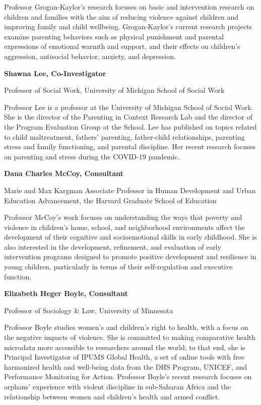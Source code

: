 \documentclass[
  letterpaper,
  DIV=11,
  numbers=noendperiod]{scrreprt}
\begin{document}
Professor Grogan-Kaylor's research focuses on basic and intervention
research on children and families with the aim of reducing violence
against children and improving family and child wellbeing.
Grogan-Kaylor's current research projects examine parenting behaviors
such as physical punishment and parental expressions of emotional warmth
and support, and their effects on children's aggression, antisocial
behavior, anxiety, and depression.

\textbf{Shawna Lee, Co-Investigator}

Professor of Social Work, University of Michigan School of Social Work

Professor Lee is a professor at the University of Michigan School of
Social Work. She is the director of the Parenting in Context Research
Lab and the director of the Program Evaluation Group at the School. Lee
has published on topics related to child maltreatment, fathers'
parenting, father-child relationships, parenting stress and family
functioning, and parental discipline. Her recent research focuses on
parenting and stress during the COVID-19 pandemic.

\textbf{Dana Charles McCoy, Consultant}

Marie and Max Kargman Associate Professor in Human Development and Urban
Education Advancement, the Harvard Graduate School of Education

Professor McCoy's work focuses on understanding the ways that poverty
and violence in children's home, school, and neighborhood environments
affect the development of their cognitive and socioemotional skills in
early childhood. She is also interested in the development, refinement,
and evaluation of early intervention programs designed to promote
positive development and resilience in young children, particularly in
terms of their self-regulation and executive function.

\textbf{Elizabeth Heger Boyle, Consultant}

Professor of Sociology \& Law, University of Minnesota

Professor Boyle studies women's and children's right to health, with a
focus on the negative impacts of violence. She is committed to making
comparative health microdata more accessible to researchers around the
world; to that end, she is Principal Investigator of IPUMS Global
Health, a set of online tools with free harmonized health and well-being
data from the DHS Program, UNICEF, and Performance Monitoring for
Action. Professor Boyle's recent research focuses on orphans' experience
with violent discipline in sub-Saharan Africa and the relationship
between women and children's health and armed conflict.
\end{document}
